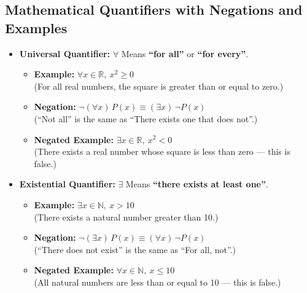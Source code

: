 \subsection{Mathematical Quantifiers with Negations and Examples}

\begin{itemize}[label=\(-\)]

	\item\textbf{Universal Quantifier:}  \(\forall\)
		Means \textbf{``for all''} or \textbf{``for every''}.

		\begin{itemize}
			\item \textbf{Example:}  \(\forall x \in \mathbb{R},\ x^2 \geq 0\) \\
			      (For all real numbers, the square is greater than or equal to zero.)

			\item \textbf{Negation:}  \(\neg (\forall x)\,P(x) \equiv (\exists x)\, \neg P(x)\) \\
			      (``Not all'' is the same as ``There exists one that does not''.)

			\item \textbf{Negated Example:}  \(\exists x \in \mathbb{R},\ x^2 < 0\) \\
			      (There exists a real number whose square is less than zero — this is false.)
		\end{itemize}

	\item\textbf{Existential Quantifier:}  \(\exists\)
		Means \textbf{``there exists at least one''}.

		\begin{itemize}
			\item \textbf{Example:}  \(\exists x \in \mathbb{N},\ x > 10\) \\
			      (There exists a natural number greater than 10.)

			\item \textbf{Negation:}  \(\neg (\exists x)\,P(x) \equiv (\forall x)\, \neg P(x)\) \\
			      (``There does not exist'' is the same as ``For all, not''.)

			\item \textbf{Negated Example:}  \(\forall x \in \mathbb{N},\ x \leq 10\) \\
			      (All natural numbers are less than or equal to 10 — this is false.)
		\end{itemize}


\end{itemize}
